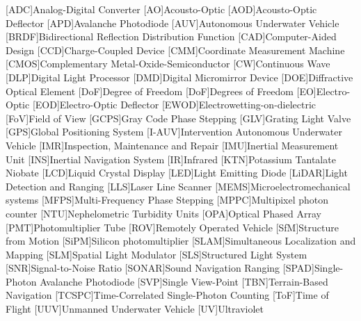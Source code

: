 \begin{acronym}[SONAR]
[ADC]{Analog-Digital Converter}
[AO]{Acousto-Optic}
[AOD]{Acousto-Optic Deflector}
[APD]{Avalanche Photodiode}
[AUV]{Autonomous Underwater Vehicle}
[BRDF]{Bidirectional Reflection Distribution Function }
[CAD]{Computer-Aided Design}
[CCD]{Charge-Coupled Device}
[CMM]{Coordinate Measurement Machine}
[CMOS]{Complementary Metal-Oxide-Semiconductor}
[CW]{Continuous Wave}
[DLP]{Digital Light Processor}
[DMD]{Digital Micromirror Device}
[DOE]{Diffractive Optical Element}
[DoF]{Degree of Freedom}
[DoF]{Degrees of Freedom}
[EO]{Electro-Optic}
[EOD]{Electro-Optic Deflector}
[EWOD]{Electrowetting-on-dielectric}
[FoV]{Field of View}
[GCPS]{Gray Code Phase Stepping}
[GLV]{Grating Light Valve}
[GPS]{Global Positioning System}
[I-AUV]{Intervention Autonomous Underwater Vehicle}
[IMR]{Inspection, Maintenance and Repair}
[IMU]{Inertial Measurement Unit}
[INS]{Inertial Navigation System}
[IR]{Infrared}
[KTN]{Potassium Tantalate Niobate}
[LCD]{Liquid Crystal Display}
[LED]{Light Emitting Diode}
[LiDAR]{Light Detection and Ranging}
[LLS]{Laser Line Scanner}
[MEMS]{Microelectromechanical systems}
[MFPS]{Multi-Frequency Phase Stepping}
[MPPC]{Multipixel photon counter}
[NTU]{Nephelometric Turbidity Units}
[OPA]{Optical Phased Array}
[PMT]{Photomultiplier Tube}
[ROV]{Remotely Operated Vehicle}
[SfM]{Structure from Motion}
[SiPM]{Silicon photomultiplier}
[SLAM]{Simultaneous Localization and Mapping}
[SLM]{Spatial Light Modulator}
[SLS]{Structured Light System}
[SNR]{Signal-to-Noise Ratio}
[SONAR]{Sound Navigation Ranging}
[SPAD]{Single-Photon Avalanche Photodiode}
[SVP]{Single View-Point}
[TBN]{Terrain-Based Navigation}
[TCSPC]{Time-Correlated Single-Photon Counting}
[ToF]{Time of Flight}
[UUV]{Unmanned Underwater Vehicle}
[UV]{Ultraviolet}
\end{acronym}
